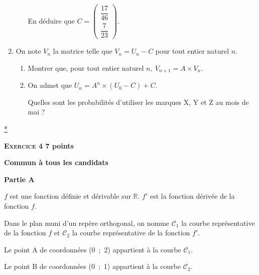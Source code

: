 \documentclass[10pt]{article}
\newcommand{\R}{\mathbb{R}}
\begin{document}
\begin{enumerate}
\begin{enumerate}
En déduire que $C = \begin{pmatrix}\dfrac{17}{46}\\[8pt]
\dfrac{7}{23}\end{pmatrix}$.
	\end{enumerate}
\item On note $V_{n}$ la matrice telle que $V_{n} = U_{n} - C$ pour tout entier naturel $n$. 
	\begin{enumerate}
		\item Montrer que, pour tout entier naturel $n,\: V_{n+1} = A \times  V_{n}$. 
		\item On admet que $U_{n} = A^n \times \left(U_{0} - C\right) + C$.
		 
Quelles sont les probabilités d'utiliser les marques X, Y et Z au mois de mai ? 
	\end{enumerate}
\end{enumerate}
\hyperlink{Index}{*}
\vspace{0,5cm}

\textbf{\textsc{Exercice 4} \hfill 7 points}
 
\textbf{Commun  à tous les candidats}

\medskip

\textbf{Partie A}
  
$f$ est une fonction définie et dérivable sur $\R$. $f'$ est la fonction dérivée de la fonction $f$.
 
Dans le plan muni d'un repère orthogonal, on nomme $\mathcal{C}_{1}$ la courbe représentative de la fonction $f$ et $\mathcal{C}_{2}$ la courbe représentative de la fonction $f'$.
 
Le point A de coordonnées (0~;~2) appartient à la courbe $\mathcal{C}_{1}$.
 
Le point B de coordonnées (0~;~1) appartient à la courbe $\mathcal{C}_{2}$.

\medskip
 
\end{document}
